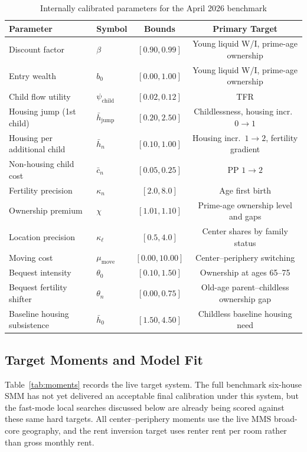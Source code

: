 \documentclass[11pt]{article}
\begin{document}
\begin{table}[!htbp]
\centering
\caption{Internally calibrated parameters for the April 2026 benchmark}
\label{tab:internal}
\begin{tabular}{llcc}
\toprule
Parameter & Symbol & Bounds & Primary Target \\
\midrule
Discount factor & $\beta$ & $[0.90, 0.99]$ & Young liquid W/I, prime-age ownership \\
Entry wealth & $b_0$ & $[0.00, 1.00]$ & Young liquid W/I, prime-age ownership \\
Child flow utility & $\psi_{\text{child}}$ & $[0.02, 0.12]$ & TFR \\
Housing jump (1st child) & $\bar h_{\text{jump}}$ & $[0.20, 2.50]$ & Childlessness, housing incr.\ $0 \to 1$ \\
Housing per additional child & $\bar h_n$ & $[0.10, 1.00]$ & Housing incr.\ $1 \to 2$, fertility gradient \\
Non-housing child cost & $\bar c_n$ & $[0.05, 0.25]$ & PP $1 \to 2$ \\
Fertility precision & $\kappa_n$ & $[2.0, 8.0]$ & Age first birth \\
Ownership premium & $\chi$ & $[1.01, 1.10]$ & Prime-age ownership level and gaps \\
Location precision & $\kappa_\ell$ & $[0.5, 4.0]$ & Center shares by family status \\
Moving cost & $\mu_{\text{move}}$ & $[0.00, 10.00]$ & Center--periphery switching \\
Bequest intensity & $\theta_0$ & $[0.10, 1.50]$ & Ownership at ages 65--75 \\
Bequest fertility shifter & $\theta_n$ & $[0.00, 0.75]$ & Old-age parent--childless ownership gap \\
Baseline housing subsistence & $\bar h_0$ & $[1.50, 4.50]$ & Childless baseline housing need \\
\bottomrule
\end{tabular}
\end{table}

\subsection{Target Moments and Model Fit}

Table~\ref{tab:moments} records the live target system. The full benchmark six-house SMM has not yet delivered an acceptable final calibration under this system, but the fast-mode local searches discussed below are already being scored against these same hard targets. All center--periphery moments use the live MMS broad-core geography, and the rent inversion target uses renter rent per room rather than gross monthly rent.
\end{document}
